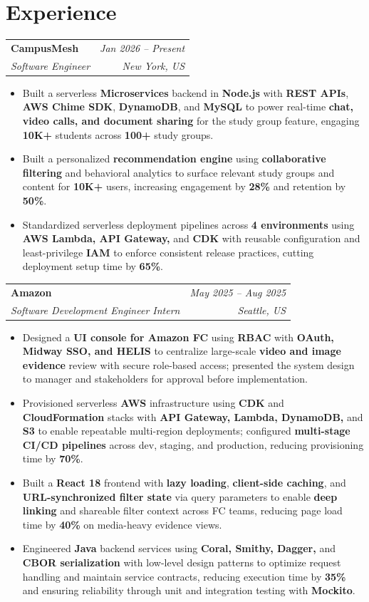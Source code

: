 \documentclass[letterpaper,10pt]{article}
\makeatletter
\newcommand{\resumeSubheading}[4]{
  \vspace{3pt}
  \begin{tabular*}{\textwidth}{@{}l@{\extracolsep{\fill}}r@{}}
    \textbf{#1} & \textit{#4} \\
    \textit{#3} & \textit{#2} \\
  \end{tabular*}\vspace{0pt}
}
\newcommand{\resumeItemListStart}{\begin{itemize}[leftmargin=12pt, itemsep=0.9pt, topsep=1.5pt, parsep=0pt]}
\newcommand{\resumeItemListEnd}{\end{itemize}\vspace{-1pt}}
\makeatother
\begin{document}
\section{Experience}
\resumeSubheading
{CampusMesh}{New York, US}
{Software Engineer}{Jan 2026 -- Present}
\resumeItemListStart
  \item \footnotesize{Built a serverless \textbf{Microservices} backend in \textbf{Node.js} with \textbf{REST APIs}, \textbf{AWS Chime SDK}, \textbf{DynamoDB}, and \textbf{MySQL} to power real-time \textbf{chat, video calls, and document sharing} for the study group feature, engaging \textbf{10K+} students across \textbf{100+} study groups.}
  \item \footnotesize{Built a personalized \textbf{recommendation engine} using \textbf{collaborative filtering} and behavioral analytics to surface relevant study groups and content for \textbf{10K+} users, increasing engagement by \textbf{28\%} and retention by \textbf{50\%}.}
  \item \footnotesize{Standardized serverless deployment pipelines across \textbf{4 environments} using \textbf{AWS Lambda, API Gateway,} and \textbf{CDK} with reusable configuration and least-privilege \textbf{IAM} to enforce consistent release practices, cutting deployment setup time by \textbf{65\%}.}
\resumeItemListEnd
\vspace{2pt}

\resumeSubheading
{Amazon}{Seattle, US}
{Software Development Engineer Intern}{May 2025 -- Aug 2025}
\resumeItemListStart
  \item \footnotesize{Designed a \textbf{UI console for Amazon FC} using \textbf{RBAC} with \textbf{OAuth, Midway SSO, and HELIS} to centralize large-scale \textbf{video and image evidence} review with secure role-based access; presented the system design to manager and stakeholders for approval before implementation.}
  \item \footnotesize{Provisioned serverless \textbf{AWS} infrastructure using \textbf{CDK} and \textbf{CloudFormation} stacks with \textbf{API Gateway, Lambda, DynamoDB,} and \textbf{S3} to enable repeatable multi-region deployments; configured \textbf{multi-stage CI/CD pipelines} across dev, staging, and production, reducing provisioning time by \textbf{70\%}.}
  \item \footnotesize{Built a \textbf{React 18} frontend with \textbf{lazy loading}, \textbf{client-side caching}, and \textbf{URL-synchronized filter state} via query parameters to enable \textbf{deep linking} and shareable filter context across FC teams, reducing page load time by \textbf{40\%} on media-heavy evidence views.}
  \item \footnotesize{Engineered \textbf{Java} backend services using \textbf{Coral, Smithy, Dagger,} and \textbf{CBOR serialization} with low-level design patterns to optimize request handling and maintain service contracts, reducing execution time by \textbf{35\%} and ensuring reliability through unit and integration testing with \textbf{Mockito}.}
\resumeItemListEnd
\vspace{2pt}
\end{document}
